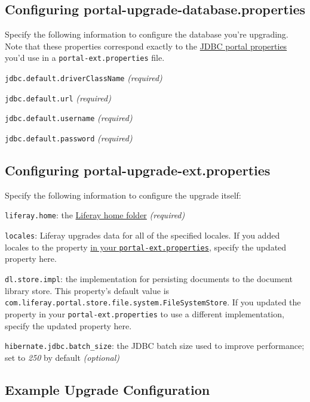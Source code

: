 \subsection{Configuring
portal-upgrade-database.properties}\label{configuring-portal-upgrade-database.properties}

Specify the following information to configure the database you're
upgrading. Note that these properties correspond exactly to the
\href{@platform-ref@/7.0-latest/propertiesdoc/portal.properties.html\#JDBC}{JDBC
portal properties} you'd use in a \texttt{portal-ext.properties} file.

\texttt{jdbc.default.driverClassName} \emph{(required)}

\texttt{jdbc.default.url} \emph{(required)}

\texttt{jdbc.default.username} \emph{(required)}

\texttt{jdbc.default.password} \emph{(required)}

\subsection{Configuring
portal-upgrade-ext.properties}\label{configuring-portal-upgrade-ext.properties}

Specify the following information to configure the upgrade itself:

\texttt{liferay.home}: the
\href{/docs/7-0/deploy/-/knowledge_base/d/installing-product\#liferay-home}{Liferay
home folder} \emph{(required)}

\texttt{locales}: Liferay upgrades data for all of the specified
locales. If you added locales to the property
\href{/docs/7-0/deploy/-/knowledge_base/d/preparing-an-upgrade-to-liferay-7\#step-6-configuring-your-documents-and-media-file-store}{in
your \texttt{portal-ext.properties}}, specify the updated property here.

\texttt{dl.store.impl}: the implementation for persisting documents to
the document library store. This property's default value is
\texttt{com.liferay.portal.store.file.system.FileSystemStore}. If you
updated the property in your \texttt{portal-ext.properties} to use a
different implementation, specify the updated property here.

\texttt{hibernate.jdbc.batch\_size}: the JDBC batch size used to improve
performance; set to \emph{250} by default \emph{(optional)}

\subsection{Example Upgrade
Configuration}\label{example-upgrade-configuration}


